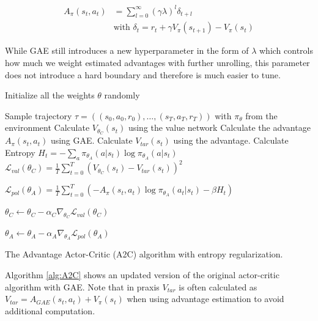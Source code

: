 \begin{align*}
  A_\pi(s_t, a_t) &= \sum^\infty_{l=0} (\gamma\lambda)^l \delta_{t+l} \\
  &\text{with } \delta_t = r_t + \gamma V_\pi(s_{t + 1}) - V_\pi(s_t) 
\end{align*}

While GAE still introduces a new hyperparameter in the form of $\lambda$ which controls how much we weight estimated advantages with further unrolling, this parameter does not introduce a hard boundary and therefore is much easier to tune. 

\begin{algorithm}[ht]
  Initialize all the weights $\theta$ randomly \;
    {
   Sample trajectory $\tau = ((s_0, a_0, r_0), \dots, (s_T, a_T, r_T))$ with $\pi_\theta$ from the environment \;
      {
      Calculate $V_{\theta_C}(s_t)$ using the value network \;
      Calculate the advantage $A_\pi(s_t, a_t)$ using GAE. \;
      Calculate $V_{tar}(s_t)$ using the advantage. \;
      Calculate Entropy $H_t = - \sum_a \pi_{\theta_A}(a|s_t) \log \pi_{\theta_A}(a|s_t)$ \;
    }
    $\mathcal{L}_{val}(\theta_C) = \frac{1}{T} \sum^T_{t=0}(V_{\theta_C}(s_t) - V_{tar}(s_t))^2$ 

    $\mathcal{L}_{pol}(\theta_A) = \frac{1}{T} \sum^T_{t=0}\left(-A_\pi(s_t, a_t) \log \pi_{\theta_A}(a_t|s_t) - \beta H_t\right)$ 

    $\theta_C \leftarrow \theta_C - \alpha_C \nabla_{\theta_C} \mathcal{L}_{val}(\theta_C)$ 
  
    $\theta_A \leftarrow \theta_A - \alpha_A \nabla_{\theta_A} \mathcal{L}_{pol}(\theta_A)$ 

  }

  \caption[The Advantage Actor-Critic Algorithm]{The Advantage Actor-Critic (A2C) algorithm with entropy regularization.}\label{alg:A2C}
 \end{algorithm}

Algorithm \ref{alg:A2C} shows an updated version of the original actor-critic algorithm with GAE. Note that in praxis $V_{tar}$ is often calculated as $V_{tar} = A_{GAE}(s_t, a_t) + V_\pi(s_t)$ when using advantage estimation to avoid additional computation. 

